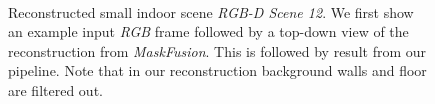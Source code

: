 \begin{figure}[t!]
    \centering
    \\
    \vspace{-2mm}
    \caption{Reconstructed small indoor scene \emph{RGB-D Scene 12}. We first show an example input \textit{RGB} frame followed by a top-down view of the reconstruction from \textit{MaskFusion}. This is followed by result from our pipeline. Note that in our reconstruction background walls and floor are filtered out. }
    \vspace*{-1em}
    \label{fig:rgbd_scene12}
\end{figure}


